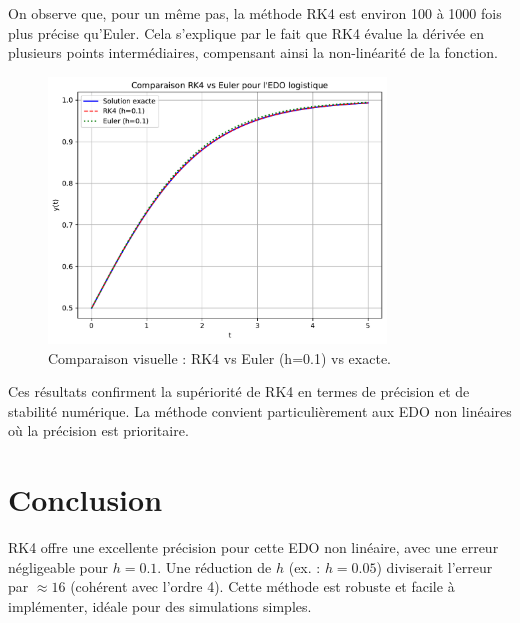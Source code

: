 \documentclass[12pt,a4paper]{article}
\begin{document}
On observe que, pour un même pas, la méthode RK4 est environ 100 à 1000 fois plus précise qu’Euler. Cela s’explique par le fait que RK4 évalue la dérivée en plusieurs points intermédiaires, compensant ainsi la non-linéarité de la fonction.

\begin{figure}[h]
\centering
\includegraphics[width=0.8\textwidth]{graph_euler.pdf}
\caption{Comparaison visuelle : RK4 vs Euler (h=0.1) vs exacte.}
\label{fig:euler}
\end{figure}

Ces résultats confirment la supériorité de RK4 en termes de précision et de stabilité numérique. La méthode convient particulièrement aux EDO non linéaires où la précision est prioritaire.

\section{Conclusion}
RK4 offre une excellente précision pour cette EDO non linéaire, avec une erreur négligeable pour $h=0.1$. Une réduction de $h$ (ex. : $h=0.05$) diviserait l'erreur par $\approx 16$ (cohérent avec l'ordre 4). Cette méthode est robuste et facile à implémenter, idéale pour des simulations simples.

\newpage


\end{document}
